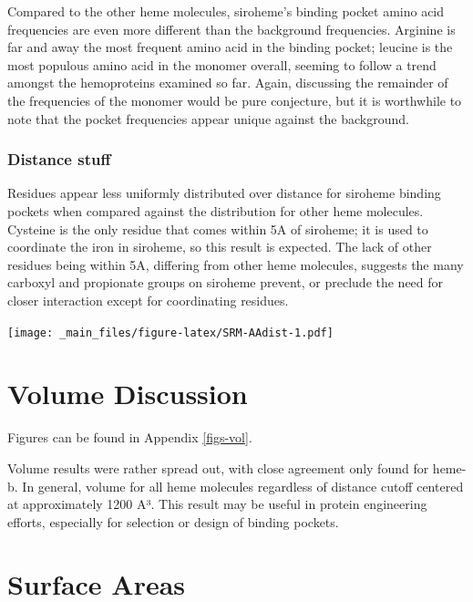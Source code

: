 \documentclass[a4paper, nobind]{templates/ociamthesis}
\let\origfigure\figure
\let\endorigfigure\endfigure
\renewenvironment{figure}[1][2] {
    \expandafter\origfigure\expandafter[H]
} {
    \endorigfigure
}
\begin{document}
Compared to the other heme molecules, siroheme's binding pocket amino acid frequencies are even more different than the background frequencies. Arginine is far and away the most frequent amino acid in the binding pocket; leucine is the most populous amino acid in the monomer overall, seeming to follow a trend amongst the hemoproteins examined so far. Again, discussing the remainder of the frequencies of the monomer would be pure conjecture, but it is worthwhile to note that the pocket frequencies appear unique against the background.

\hypertarget{distance-stuff}{%
\subsubsection{Distance stuff}\label{distance-stuff}}

Residues appear less uniformly distributed over distance for siroheme binding pockets when compared against the distribution for other heme molecules. Cysteine is the only residue that comes within 5A of siroheme; it is used to coordinate the iron in siroheme, so this result is expected. The lack of other residues being within 5A, differing from other heme molecules, suggests the many carboxyl and propionate groups on siroheme prevent, or preclude the need for closer interaction except for coordinating residues.

\begin{figure}
\centering
\texttt{[image: \_main\_files/figure-latex/SRM-AAdist-1.pdf]}
\caption{\label{fig:SRM-AAdist}SRM: AA Distances}
\end{figure}

\hypertarget{volume-discussion}{%
\section{Volume Discussion}\label{volume-discussion}}

Figures can be found in Appendix \ref{figs-vol}.

Volume results were rather spread out, with close agreement only found for heme-b. In general, volume for all heme molecules regardless of distance cutoff centered at approximately 1200 A³. This result may be useful in protein engineering efforts, especially for selection or design of binding pockets.

\hypertarget{surface-areas}{%
\section{Surface Areas}\label{surface-areas}}
\end{document}
